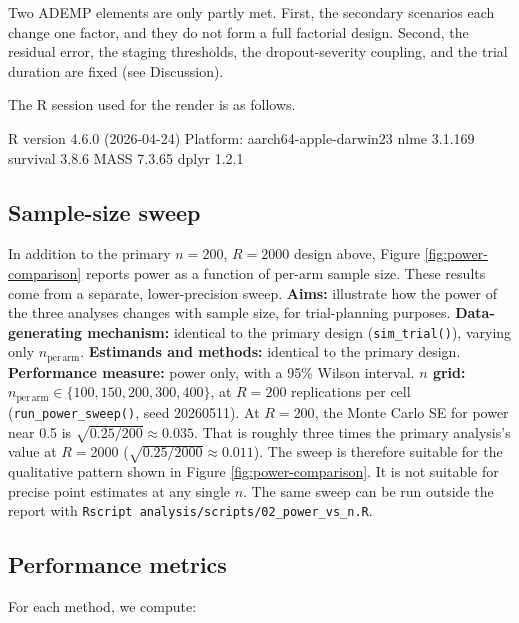 \documentclass[
  11pt,
]{article}
\begin{document}
Two ADEMP elements are only partly met. First, the
secondary scenarios each change one factor, and they do
not form a full factorial design. Second, the residual
error, the staging thresholds, the dropout-severity
coupling, and the trial duration are fixed (see
Discussion).

The R session used for the render is as follows.

R version 4.6.0 (2026-04-24)
Platform: aarch64-apple-darwin23
nlme 3.1.169
survival 3.8.6
MASS 7.3.65
dplyr 1.2.1

\subsection{Sample-size sweep}\label{sample-size-sweep}

In addition to the primary \(n = 200\), \(R = 2000\) design
above, Figure \ref{fig:power-comparison} reports power as
a function of per-arm sample size. These results come from
a separate, lower-precision sweep. \textbf{Aims:} illustrate
how the power of the three analyses changes with sample
size, for trial-planning purposes. \textbf{Data-generating
mechanism:} identical to the primary design
(\texttt{sim\_trial()}), varying only \(n_{\mathrm{per\,arm}}\).
\textbf{Estimands and methods:} identical to the primary
design. \textbf{Performance measure:} power only, with a
95\% Wilson interval. \textbf{\(n\) grid:}
\(n_{\mathrm{per\,arm}} \in \{100, 150, 200, 300, 400\}\), at
\(R = 200\) replications per cell (\texttt{run\_power\_sweep()},
seed 20260511). At \(R = 200\), the Monte Carlo SE for
power near 0.5 is \(\sqrt{0.25/200} \approx 0.035\). That is
roughly three times the primary analysis's value at
\(R = 2000\) (\(\sqrt{0.25/2000} \approx 0.011\)). The sweep is
therefore suitable for the qualitative pattern shown in
Figure \ref{fig:power-comparison}. It is not suitable for
precise point estimates at any single \(n\). The same sweep
can be run outside the report with
\texttt{Rscript\ analysis/scripts/02\_power\_vs\_n.R}.

\subsection{Performance metrics}\label{performance-metrics}

For each method, we compute:
\end{document}
